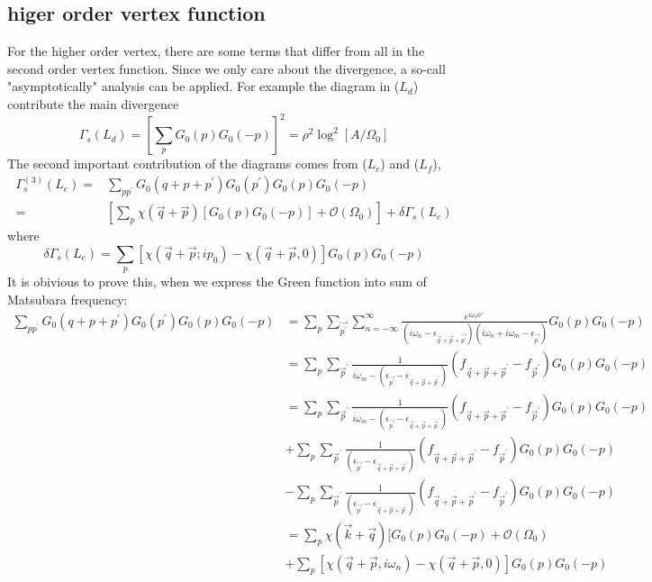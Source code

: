 \documentclass[12pt]{article}
\numberwithin{equation}{section}
\begin{document}
\subsection{higer order vertex function}
	For the higher order vertex, there are some terms that differ from all in the second order vertex function. Since we only care about the divergence, a so-call "asymptotically" analysis can be applied.
	For example the diagram in ($L_d$) contribute the main divergence
	\begin{equation}
		\Gamma_{s}\left(L_{d}\right)=\left[\sum_{p} G_{0}(p) G_{0}(-p)\right]^{2}=\rho^{2} \log ^{2}\left[A / \Omega_{0}\right]
		\end{equation}
The second important contribution of the diagrams comes from ($L_c$) and ($L_f$),
\begin{equation}
	\begin{aligned}
	\Gamma_{s}^{(3)}\left(L_{e}\right)=& \sum_{p p^{\prime}} G_{0}\left(q+p+p^{\prime}\right) G_{0}\left(p^{\prime}\right) G_{0}(p) G_{0}(-p) \\
	=&\left[\sum_{p} \chi(\vec{q}+\vec{p})\left[G_{0}(p) G_{0}(-p)\right]+\mathcal{O}\left(\Omega_{0}\right)\right]+\delta \Gamma_{s}\left(L_{e}\right)
	\end{aligned}
	\end{equation}
where
\begin{equation}
	\delta \Gamma_{s}\left(L_{e}\right)=\sum_{p}\left[\chi\left(\vec{q}+\vec{p} ; i p_{0}\right)-\chi(\vec{q}+\vec{p}, 0)\right] G_{0}(p) G_{0}(-p)
	\end{equation}
It is obivious to prove this, when we express the Green function into sum of Matsubara frequency:
\begin{equation}
	\begin{aligned}
\sum_{pp^\prime}G_0(q+p+p^\prime)G_0(p^\prime)G_0(p)G_0(-p) & = \sum_{p}\sum_{\vec{p^\prime}}\sum_{n=-\infty}^{\infty}\frac{e^{i \omega_{n} 0^{+}}}{\left(i \omega_{n}-\epsilon_{\vec{q}+\vec{p}+\vec{p^\prime}} \right)\left(i \omega_{n}+i\omega_{m}-\epsilon_{\vec{p^\prime}}\right)}G_0(p)G_0(-p)\\
& =\sum_{p}\sum_{\vec{p}^\prime}\frac{1}{i\omega_{m}-(\epsilon_{\vec{p^\prime}}-\epsilon_{\vec{q}+\vec{p}+\vec{p}^\prime})}(f_{\vec{q}+\vec{p}+\vec{p}^\prime}-f_{\vec{p}^\prime})G_0(p)G_0(-p)\\
& =\sum_{p}\sum_{\vec{p}^\prime}\frac{1}{i\omega_{m}-(\epsilon_{\vec{p^\prime}}-\epsilon_{\vec{q}+\vec{p}+\vec{p}^\prime})}(f_{\vec{q}+\vec{p}+\vec{p}^\prime}-f_{\vec{p}^\prime})G_0(p)G_0(-p)\\
& +\sum_{p}\sum_{\vec{p}^\prime}\frac{1}{(\epsilon_{\vec{p^\prime}}-\epsilon_{\vec{q}+\vec{p}+\vec{p}^\prime})}(f_{\vec{q}+\vec{p}+\vec{p}^\prime}-f_{\vec{p}^\prime})G_0(p)G_0(-p)\\
& -\sum_{p}\sum_{\vec{p}^\prime}\frac{1}{(\epsilon_{\vec{p^\prime}}-\epsilon_{\vec{q}+\vec{p}+\vec{p}^\prime})}(f_{\vec{q}+\vec{p}+\vec{p}^\prime}-f_{\vec{p}^\prime})G_0(p)G_0(-p)\\
& =\sum_{p}\chi(\vec{k}+\vec{q})[G_0(p)G_0(-p)+\mathcal{O}(\Omega_0)\\
& +\sum_{p}[\chi(\vec{q}+\vec{p},i\omega_n)-\chi(\vec{q}+\vec{p},0)]G_0(p)G_0(-p)
	\end{aligned}
\end{equation}
\end{document}
